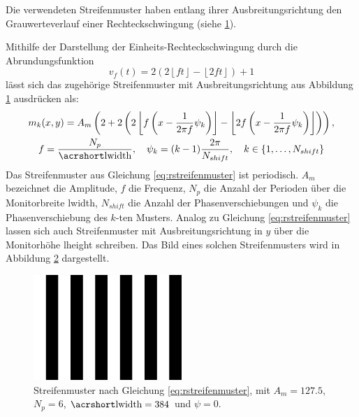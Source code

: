 Die verwendeten Streifenmuster haben entlang ihrer Ausbreitungsrichtung den Grauwerteverlauf einer Rechteckschwingung (siehe \ref{tikz:abbRechteckschwingung}).
%
{
	\begin{figure}[H]
		\centering
		
		\label{tikz:abbRechteckschwingung}
	\end{figure}
}

\noindent
Mithilfe der Darstellung der Einheits-Rechteckschwingung durch die Abrundungsfunktion
\begin{equation*}
	v_f(t) = 2 \left( 2 \left\lfloor ft \right\rfloor - \left\lfloor 2ft \right\rfloor \right) + 1
\end{equation*}
lässt sich das zugehörige Streifenmuster mit Ausbreitungsrichtung aus Abbildung \ref{tikz:abbRechteckschwingung} ausdrücken als:
\begin{equation} \label{eq:rstreifenmuster}
	\begin{gathered}
		m_k(x,y) = A_m 
		\left(
			2 + 2 
			\left(2 
				\left\lfloor f \left(x - \dfrac{1}{2\pi f} \psi_k \right) \right\rfloor 
				- 
				\left\lfloor 2 f \left(x - \dfrac{1}{2\pi f} \psi_k \right) \right\rfloor
			\right)
		\right),\\
		f = \dfrac{N_p}{\acrshortmath{lwidth}},
		\quad
		\psi_k = (k - 1)\dfrac{2\pi}{N_{shift}},
		\quad
		k \in \lbrace 1,\ldots,N_{shift}\rbrace 
	\end{gathered}
\end{equation}
%
Das Streifenmuster aus Gleichung \ref{eq:rstreifenmuster} ist periodisch.
$A_m$ bezeichnet die Amplitude, $f$ die Frequenz, $N_p$ die Anzahl der Perioden über die Monitorbreite \acrshort{lwidth}, $N_{shift}$ die Anzahl der Phasenverschiebungen und $\psi_k$ die Phasenverschiebung des $k$-ten Musters.
Analog zu Gleichung \ref{eq:rstreifenmuster} lassen sich auch Streifenmuster mit Ausbreitungsrichtung in $y$ über die Monitorhöhe \acrshort{lheight} schreiben.
Das Bild eines solchen Streifenmusters wird in Abbildung \ref{img:rechteckStreifenmuster} dargestellt.
%
\begin{figure}[H]
	\centering
	\includegraphics[frame,width=0.5\textwidth]{03_sichtpruefungDurchLichtstreuung/einsatzVonMehrerenStreifenmustern/figures/rechteckStreifenmuster}
	\caption[Rechteckförmiges Streifenmuster]{Streifenmuster nach Gleichung \ref{eq:rstreifenmuster}, mit $A_m = 127.5$, $N_p = 6$, $\acrshortmath{lwidth} = 384$ und $\psi = 0$.}
	\label{img:rechteckStreifenmuster}
\end{figure}


